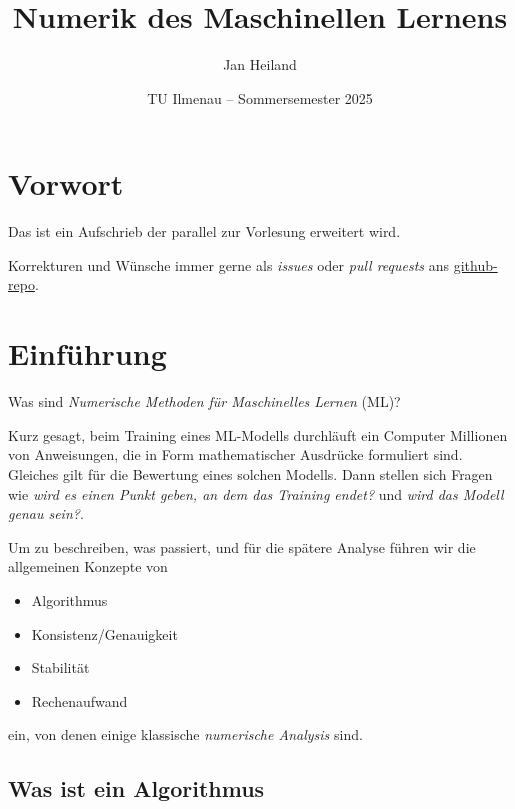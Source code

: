 \documentclass[
]{book}
\title{Numerik des Maschinellen Lernens}
\author{Jan Heiland}
\date{TU Ilmenau -- Sommersemester 2025}
\providecommand{\tightlist}{%
  \setlength{\itemsep}{0pt}\setlength{\parskip}{0pt}}
\theoremstyle{definition}
\theoremstyle{definition}
\theoremstyle{definition}
\theoremstyle{definition}
\theoremstyle{remark}
\begin{document}
\maketitle

{
\hypersetup{linkcolor=}
\setcounter{tocdepth}{1}
\tableofcontents
}
\hypertarget{vorwort}{%
\chapter*{Vorwort}\label{vorwort}}

Das ist ein Aufschrieb der parallel zur Vorlesung erweitert wird.

Korrekturen und Wünsche immer gerne als \emph{issues} oder \emph{pull requests} ans \href{https://github.com/highlando/script-ndml}{github-repo}.

\hypertarget{einfuxfchrung}{%
\chapter{Einführung}\label{einfuxfchrung}}

Was sind \emph{Numerische Methoden für Maschinelles Lernen} (ML)?

Kurz gesagt, beim Training eines ML-Modells durchläuft ein Computer Millionen von Anweisungen, die in Form mathematischer Ausdrücke formuliert sind. Gleiches gilt für die Bewertung eines solchen Modells.
Dann stellen sich Fragen wie \emph{wird es einen Punkt geben, an dem das Training endet?} und \emph{wird das Modell genau sein?}.

Um zu beschreiben, was passiert, und für die spätere Analyse führen wir die allgemeinen Konzepte von

\begin{itemize}
\tightlist
\item
  Algorithmus
\item
  Konsistenz/Genauigkeit
\item
  Stabilität
\item
  Rechenaufwand
\end{itemize}

ein, von denen einige klassische \emph{numerische Analysis} sind.

\hypertarget{was-ist-ein-algorithmus}{%
\section{Was ist ein Algorithmus}\label{was-ist-ein-algorithmus}}
\end{document}
